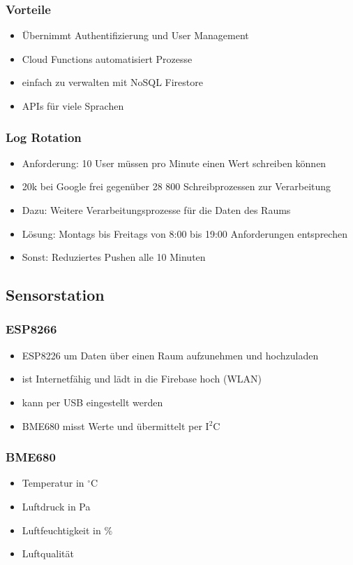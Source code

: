 \documentclass[11pt]{beamer}
\begin{document}
\begin{frame}
	\frametitle{Vorteile}
	
	\begin{itemize}
		\item Übernimmt Authentifizierung und User Management
		\item Cloud Functions automatisiert Prozesse
		\item einfach zu verwalten mit NoSQL Firestore
		\item APIs für viele Sprachen
	\end{itemize}

\end{frame}

\begin{frame}
	\frametitle{Log Rotation}
	
	\begin{itemize}
		\item Anforderung: 10 User müssen pro Minute einen Wert schreiben können
		\item 20k bei Google frei gegenüber 28 800 Schreibprozessen zur Verarbeitung
		\item Dazu: Weitere Verarbeitungsprozesse für die Daten des Raums
		\item Lösung: Montags bis Freitags von 8:00 bis 19:00 Anforderungen entsprechen
		\item Sonst: Reduziertes Pushen alle 10 Minuten
	\end{itemize}

\end{frame}

\subsection{Sensorstation}

\begin{frame}
\frametitle{ESP8266}
\begin{itemize}
\item ESP8226 um Daten über einen Raum aufzunehmen und hochzuladen
\item ist Internetfähig und lädt in die Firebase hoch (WLAN)
\item kann per USB eingestellt werden
\item BME680 misst Werte und übermittelt per I$^2$C
\end{itemize}
\end{frame}

\begin{frame}
	\frametitle{BME680}
	\begin{itemize}
	\item Temperatur in $^\circ$C
	\item Luftdruck in Pa
	\item Luftfeuchtigkeit in $\%$
	\item Luftqualität
	\end{itemize}
\end{frame}
\end{document}
